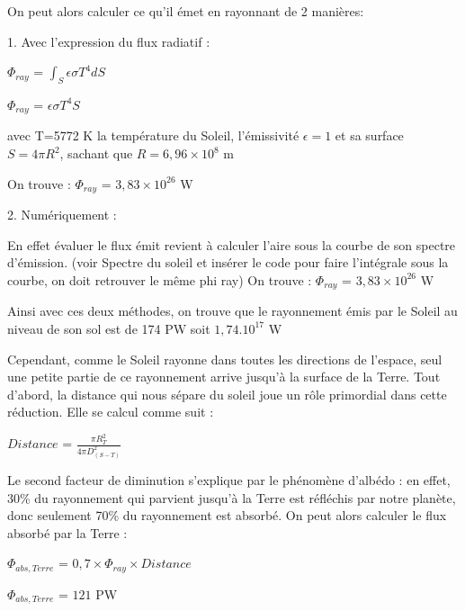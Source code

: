 \documentclass[a4paper, 12pt]{report} %
\begin{document}
\noindent On peut alors calculer ce qu'il émet en rayonnant de 2 manières: \vspace{\baselineskip}

1. Avec l'expression du flux radiatif :
\begin{center}
$\Phi_{ray}$ = $\int_S \epsilon \sigma T^{4} dS$    
\end{center}
\begin{center}
$\Phi_{ray}$ = $\epsilon \sigma T^{4} S$    
\end{center}
avec T=5772 K la température du Soleil, l'émissivité 
$\epsilon = 1$ 
et sa surface $S=4 \pi R^{2}$, sachant que $R= 6,96 \times 10^{8}$ m 
\vspace{\baselineskip}

\noindent On trouve : \vspace{\baselineskip}
$\Phi_{ray}$ = $3,83 \times 10^{26}$ W 

2. Numériquement : \vspace{\baselineskip}

En effet évaluer le flux émit revient à calculer l'aire sous la courbe de son spectre d'émission. (voir Spectre du soleil et insérer 
le code pour faire l'intégrale sous la courbe, on doit retrouver le même phi ray) \vspace{\baselineskip}
\newline On trouve :
$\Phi_{ray}$ = $3,83 \times 10^{26}$ W \vspace{\baselineskip}

Ainsi avec ces deux méthodes, on trouve que le rayonnement émis par le Soleil au niveau de son sol
est de 174 PW  soit $1,74.10^{17}$ W \vspace{\baselineskip}
\vspace{\baselineskip}
\vspace{\baselineskip}


Cependant, comme le Soleil rayonne dans toutes les directions de l’espace, seul une petite partie de ce rayonnement arrive jusqu’à la surface de la Terre. 
Tout d’abord, la distance qui nous sépare du soleil joue un rôle primordial dans cette réduction. 
\newline Elle se calcul comme suit :
\begin{center}
$Distance$ = $\frac{\pi R_T^{2}}{4 \pi D_{(S-T)}^{2}}$    
\end{center}

Le second facteur de diminution s’explique par le phénomène d’albédo : en effet, 30\% du rayonnement qui parvient jusqu’à la Terre est réfléchis par notre planète, donc seulement 70\% du rayonnement est absorbé. 
\newline On peut alors calculer le flux absorbé par la Terre : 
\begin{center}
$\Phi_{abs,Terre}$ = $0,7 \times \Phi_{ray} \times Distance$    
\end{center}
\begin{center}
$\Phi_{abs,Terre}$ = $121$ PW    
\end{center}
\end{document}
